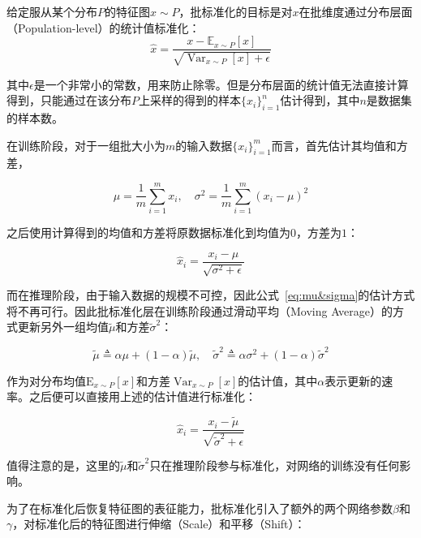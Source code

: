 给定服从某个分布$P$的特征图$x\sim P$，批标准化的目标是对$x$在批维度通过分布层面（Population-level）的统计值标准化：
\begin{equation}
  \widehat{x}=\frac{x-\mathbb{E}_{x \sim P}[x]}{\sqrt{\operatorname{Var}_{x \sim P}[x]+\epsilon}}
\end{equation}

其中$\epsilon$是一个非常小的常数，用来防止除零。但是分布层面的统计值无法直接计算得到，只能通过在该分布$P$上采样的得到的样本$\{x_{i}\}_{i=1}^{n}$估计得到，其中$n$是数据集的样本数。 

在训练阶段，对于一组批大小为$m$的输入数据$\{x_{i}\}_{i=1}^{m}$而言，首先估计其均值和方差，

\begin{equation}
    \label{eq:mu&sigma}
    \mu=\frac{1}{m} \sum_{i=1}^{m} x_{i},\quad \sigma^{2}=\frac{1}{m} \sum_{i=1}^{m}\left(x_{i}-\mu\right)^{2}
\end{equation}


之后使用计算得到的均值和方差将原数据标准化到均值为$0$，方差为$1$：

\begin{equation}
  \widehat{x}_{i}=\frac{x_{i}-\mu}{\sqrt{\sigma^{2}+\epsilon}}
\end{equation}
  
而在推理阶段，由于输入数据的规模不可控，因此公式~\ref{eq:mu&sigma}的估计方式将不再可行。因此批标准化层在训练阶段通过滑动平均（Moving Average）的方式更新另外一组均值$\tilde{\mu}$和方差$\tilde{\sigma}^2$：

\begin{equation}
    \tilde{\mu} \triangleq \alpha \mu + (1 - \alpha) \tilde{\mu},\quad \tilde{\sigma}^2 \triangleq \alpha {\sigma}^2 + (1 - \alpha) \tilde{\sigma}^2
\end{equation}

作为对分布均值$\mathrm{E}_{x \sim P}[x]$和方差$\operatorname{Var}_{x \sim P}[x]$的估计值，其中$\alpha$表示更新的速率。之后便可以直接用上述的估计值进行标准化：

\begin{equation}
  \widehat{x}_{i}=\frac{x_{i}-\tilde{\mu}}{\sqrt{\tilde{\sigma}^{2}+\epsilon}}
\end{equation}

值得注意的是，这里的$\tilde{\mu}$和$\tilde{\sigma}^2$只在推理阶段参与标准化，对网络的训练没有任何影响。

为了在标准化后恢复特征图的表征能力，批标准化引入了额外的两个网络参数$\beta$和$\gamma$，对标准化后的特征图进行伸缩（Scale）和平移（Shift）：


